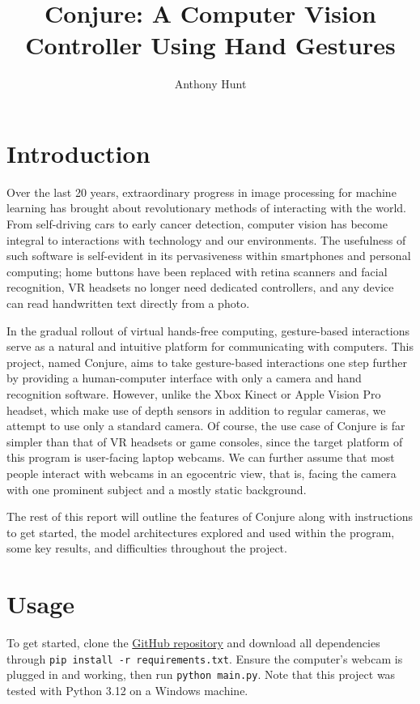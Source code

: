 \documentclass{article}
\title{Conjure: A Computer Vision Controller Using Hand Gestures}
\author{Anthony Hunt}
\begin{document}
\maketitle

\section{Introduction}
Over the last 20 years, extraordinary progress in image processing for machine learning has brought about revolutionary methods of interacting with the world. From self-driving cars to early cancer detection, computer vision has become integral to interactions with technology and our environments. The usefulness of such software is self-evident in its pervasiveness within smartphones and personal computing; home buttons have been replaced with retina scanners and facial recognition, VR headsets no longer need dedicated controllers, and any device can read handwritten text directly from a photo.

In the gradual rollout of virtual hands-free computing, gesture-based interactions serve as a natural and intuitive platform for communicating with computers. This project, named Conjure, aims to take gesture-based interactions one step further by providing a human-computer interface with only a camera and hand recognition software. However, unlike the Xbox Kinect or Apple Vision Pro headset, which make use of depth sensors in addition to regular cameras, we attempt to use only a standard camera. Of course, the use case of Conjure is far simpler than that of VR headsets or game consoles, since the target platform of this program is user-facing laptop webcams. We can further assume that most people interact with webcams in an egocentric view, that is, facing the camera with one prominent subject and a mostly static background.

The rest of this report will outline the features of Conjure along with instructions to get started, the model architectures explored and used within the program, some key results, and difficulties throughout the project.

\section{Usage}
To get started, clone the \href{https://github.com/Ant13731/conjure}{GitHub repository} and download all dependencies through \texttt{pip install -r requirements.txt}. Ensure the computer's webcam is plugged in and working, then run \texttt{python main.py}. Note that this project was tested with Python 3.12 on a Windows machine.
\end{document}
